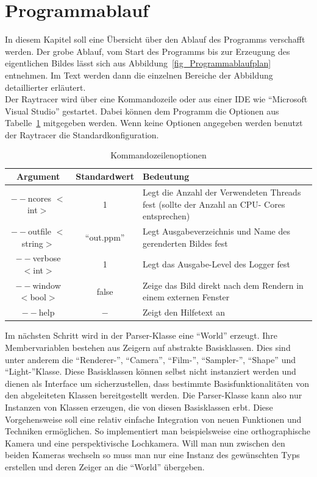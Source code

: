 \section{Programmablauf}

In diesem Kapitel soll eine Übersicht über den Ablauf des Programms verschafft werden. Der grobe Ablauf, vom Start des Programms bis zur Erzeugung des eigentlichen Bildes lässt sich aus Abbildung~\ref{fig_Programmablaufplan} entnehmen. Im Text werden dann die einzelnen Bereiche der Abbildung detaillierter erläutert.\\

Der Raytracer wird über eine Kommandozeile oder aus einer IDE wie "`Microsoft Visual Studio"' gestartet. Dabei können dem Programm die Optionen aus Tabelle~\ref{tab_Optionen} mitgegeben werden. Wenn keine Optionen angegeben werden benutzt der Raytracer die Standardkonfiguration.


\begin{table}[h]
    \begin{tabular}{|c|c|p{8cm}|}
    \hline 
    \textbf{Argument} & \textbf{Standardwert} & \textbf{Bedeutung} \\ 
    \hline 
    $--$ncores $<$int$>$ & 1 & Legt die Anzahl der Verwendeten Threads fest (sollte der Anzahl 
    an CPU-    Cores entsprechen) \\ 
    \hline 
     $--$outfile $<$string$>$ & "`out.ppm"' & Legt Ausgabeverzeichnis und Name des gerenderten 
     Bildes fest     \\ 
    \hline 
    $--$verbose $<$int$>$ & 1 & Legt das Ausgabe-Level des Logger fest \\ 
    \hline 
    $--$window $<$bool$>$ & false & Zeige das Bild direkt nach dem Rendern in einem externen Fenster \\ 
    \hline 
    $--$help & $-$ & Zeigt den Hilfetext an \\
    \hline
    \end{tabular}
    \caption{Kommandozeilenoptionen}
    \label{tab_Optionen}
\end{table}

Im nächsten Schritt wird in der Parser-Klasse eine "`World"' erzeugt. Ihre Membervariablen bestehen aus
Zeigern auf abstrakte Basisklassen. Dies sind unter anderem die "`Renderer-"', "`Camera"', "`Film-"', "`Sampler-"', "`Shape"' und "`Light-"'Klasse.
Diese Basisklassen können selbst nicht instanziert werden und dienen als Interface um sicherzustellen, dass bestimmte Basisfunktionalitäten von den abgeleiteten Klassen bereitgestellt werden. Die Parser-Klasse kann also nur Instanzen von Klassen erzeugen, die von diesen Basisklassen erbt. Diese Vorgehensweise soll eine relativ einfache Integration von neuen Funktionen und Techniken ermöglichen. So implementiert man beispielsweise eine orthographische Kamera und eine perspektivische Lochkamera. Will man nun zwischen den beiden Kameras wechseln so muss man nur eine Instanz des gewünschten Typs erstellen und deren Zeiger an die "`World"' übergeben.



